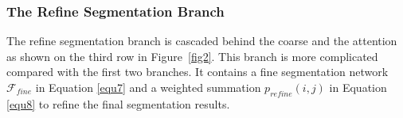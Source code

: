 \documentclass[10.5pt,compsoc]{TsT}
\theoremstyle{mystyle}
\begin{document}
{%


\subsubsection{The Refine Segmentation Branch}
\label{s:rsb}
\noindent

The refine segmentation branch is cascaded behind the coarse and the attention as shown on the third row in Figure~\ref{fig2}. This branch is more complicated compared with the first two branches. It contains a fine segmentation network $\mathcal{F}_{fine}$ in Equation \ref{equ7} and a weighted summation $p_{refine}(i,j)$ in Equation \ref{equ8} to refine the final segmentation results.

}
\end{document}
